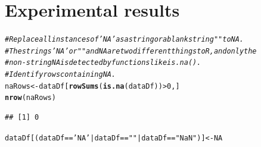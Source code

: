 \documentclass[12pt]{report}\usepackage[]{graphicx}\usepackage[]{xcolor}
\makeatletter
\newcommand{\hlnum}[1]{\textcolor[rgb]{0.686,0.059,0.569}{#1}}%
\newcommand{\hlstr}[1]{\textcolor[rgb]{0.192,0.494,0.8}{#1}}%
\newcommand{\hlcom}[1]{\textcolor[rgb]{0.678,0.584,0.686}{\textit{#1}}}%
\newcommand{\hlopt}[1]{\textcolor[rgb]{0,0,0}{#1}}%
\newcommand{\hlstd}[1]{\textcolor[rgb]{0.345,0.345,0.345}{#1}}%
\newcommand{\hlkwb}[1]{\textcolor[rgb]{0.69,0.353,0.396}{#1}}%
\newcommand{\hlkwd}[1]{\textcolor[rgb]{0.737,0.353,0.396}{\textbf{#1}}}%
\newenvironment{kframe}{%
 \def\at@end@of@kframe{}%
 \ifinner\ifhmode%
  \def\at@end@of@kframe{\end{minipage}}%
  \begin{minipage}{\columnwidth}%
 \fi\fi%
 \def\FrameCommand##1{\hskip\@totalleftmargin \hskip-\fboxsep
 \colorbox{shadecolor}{##1}\hskip-\fboxsep
     \hskip-\linewidth \hskip-\@totalleftmargin \hskip\columnwidth}%
 \MakeFramed {\advance\hsize-\width
   \@totalleftmargin\z@ \linewidth\hsize
   \@setminipage}}%
 {\par\unskip\endMakeFramed%
 \at@end@of@kframe}
\newenvironment{knitrout}{}{} %
\makeatother
\begin{document}
    \pagebreak
    
    \chapter{Experimental results}


    

\begin{knitrout}
\color{fgcolor}\begin{kframe}
\begin{alltt}
\hlcom{# Replace all instances of 'NA' as a string or a blank string "" to NA.}
\hlcom{# The strings 'NA' or " " and NA are two different things to R, and only the}
\hlcom{# non-string NA is detected by functions like is.na().}
\hlcom{# Identify rows containing NA.}
\hlstd{naRows} \hlkwb{<-} \hlstd{dataDf[}\hlkwd{rowSums}\hlstd{(}\hlkwd{is.na}\hlstd{(dataDf))} \hlopt{>} \hlnum{0}\hlstd{,]}
\hlkwd{nrow}\hlstd{(naRows)}
\end{alltt}
\begin{verbatim}
## [1] 0
\end{verbatim}
\begin{alltt}
\hlstd{dataDf[(dataDf} \hlopt{==} \hlstr{'NA'} \hlopt{|} \hlstd{dataDf} \hlopt{==} \hlstr{""} \hlopt{|} \hlstd{dataDf} \hlopt{==} \hlstr{"NaN"}\hlstd{)]} \hlkwb{<-} \hlnum{NA}


\end{alltt}
\end{kframe}
\end{knitrout}
\end{document}
